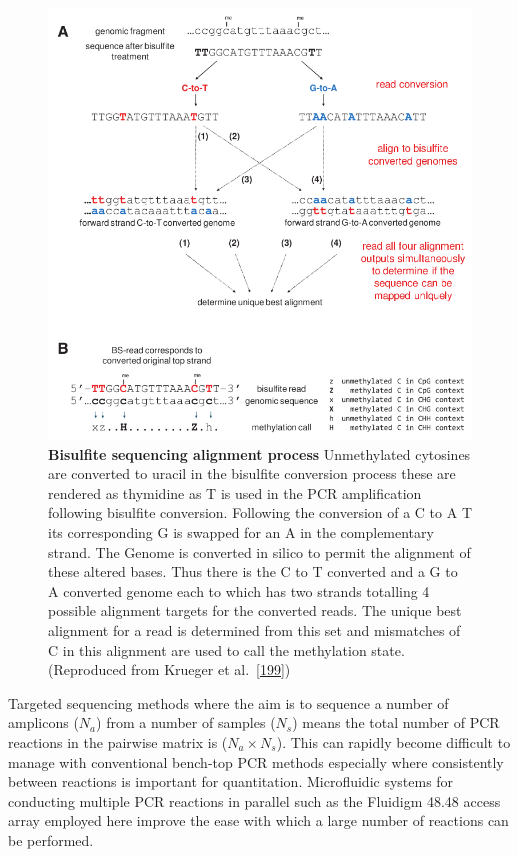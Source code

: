 \documentclass[
]{book}
\begin{document}
\begin{figure}

{\centering \includegraphics[width=0.6\linewidth]{figs/Krueger2011BismarkAlignment} 

}

\caption{\textbf{Bisulfite sequencing alignment process} Unmethylated cytosines are converted to uracil in the bisulfite conversion process these are rendered as thymidine as T is used in the PCR amplification following bisulfite conversion. Following the conversion of a C to A T its corresponding G is swapped for an A in the complementary strand. The Genome is converted in silico to permit the alignment of these altered bases. Thus there is the C to T converted and a G to A converted genome each to which has two strands totalling 4 possible alignment targets for the converted reads. The unique best alignment for a read is determined from this set and mismatches of C in this alignment are used to call the methylation state. (Reproduced from Krueger et al.~{[}\protect\hyperlink{ref-Krueger2011}{199}{]})}\label{fig:Krueger2011BismarkAlignment}
\end{figure}



Targeted sequencing methods where the aim is to sequence a number of amplicons (\(N_a\)) from a number of samples (\(N_s\)) means the total number of PCR reactions in the pairwise matrix is (\(N_a \times N_s\)).
This can rapidly become difficult to manage with conventional bench-top PCR methods especially where consistently between reactions is important for quantitation.
Microfluidic systems for conducting multiple PCR reactions in parallel such as the Fluidigm 48.48 access array employed here improve the ease with which a large number of reactions can be performed.
\end{document}
